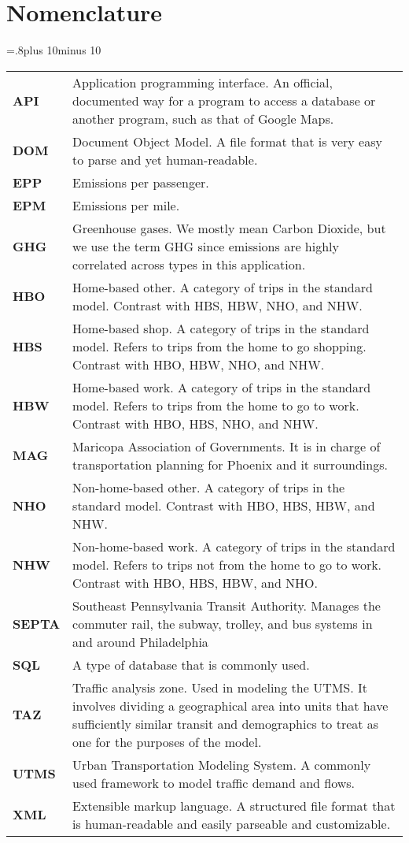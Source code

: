 \documentclass[12pt]{article}
\begin{document}
\section{Nomenclature}
{\centering
\midcolumnwidth=.8\textwidth plus 10\tabcolsep minus 10\tabcolsep
\begin{tabular}{%
    >{\raggedright\bfseries}p{}%
    p{\midcolumnwidth}}
  API & Application programming interface. An official, documented way
  for a program to access a database or another program, such as that
  of Google Maps. \\
  DOM & Document Object Model. A file format that is very easy to
  parse and yet human-readable. \\
  EPP & Emissions per passenger. \\
  EPM & Emissions per mile. \\
  GHG & Greenhouse gases. We mostly mean Carbon Dioxide, but we use
  the term GHG since emissions are highly correlated across types in
  this application. \\
  HBO & Home-based other. A category of trips in the
  standard  model. Contrast with HBS, HBW, NHO, and NHW. \\
  HBS & Home-based shop. A category of trips in the standard
  model. Refers to trips from the home to go shopping. Contrast with
  HBO, HBW, NHO, and NHW. \\
  HBW & Home-based work. A category of trips in the standard
  model. Refers to trips from the home to go to work. Contrast with
  HBO, HBS, NHO, and NHW. \\
  MAG & Maricopa Association of Governments. It is in charge of
  transportation planning for Phoenix and it surroundings. \\
  NHO & Non-home-based other. A category of trips in the standard
  model. Contrast with  HBO, HBS, HBW, and NHW. \\
  NHW & Non-home-based work. A category of trips in the standard
  model. Refers to trips not from the home to go to work. Contrast
  with HBO, HBS, HBW, and NHO. \\
  SEPTA & Southeast Pennsylvania Transit Authority. Manages the
  commuter rail, the subway, trolley, and bus systems in and around
  Philadelphia \\
  SQL & A type of database that is commonly used. \\
  TAZ & Traffic analysis zone. Used in modeling the UTMS. It involves
  dividing a geographical area into units that have sufficiently
  similar transit and demographics to treat as one for the purposes of
  the model. \\
  UTMS & Urban Transportation Modeling System. A commonly used
  framework to model traffic demand and flows. \\
  XML & Extensible markup language. A structured file format that is
  human-readable and easily parseable and customizable. \\
\end{tabular}
}
\end{document}
